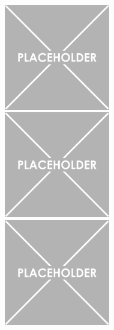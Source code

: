 \documentclass[a4paper, 11pt]{report}
\begin{document}
\begin{figure}[htbp]
\begin{minipage}[b]{.32\textwidth}
\includegraphics[width=6cm, height=4.6cm]{figs/placeholder.png}
\end{minipage}\hfill
\begin{minipage}[b]{.32\textwidth}
\includegraphics[width=6cm, height=4.6cm]{figs/placeholder.png}
\end{minipage} \hfill
\begin{minipage}[b]{.32\textwidth}
\includegraphics[width=6cm, height=4.6cm]{figs/placeholder.png}
\end{minipage} \hfill \vspace{10pt}


\end{figure}
\end{document}
